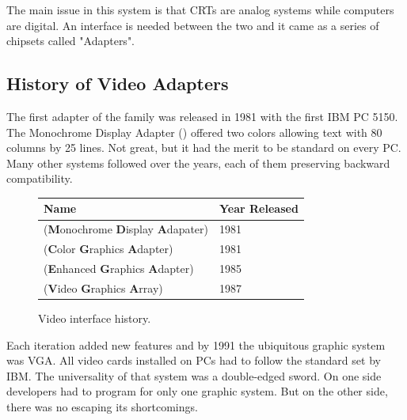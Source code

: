 \documentclass[book.tex]{subfiles}
\begin{document}
\par
The main issue in this system is that CRTs are analog systems while computers are digital. An interface is needed between the two and it came as a series of chipsets called "Adapters". 

  \subsection{History of Video Adapters}

The first adapter of the family was released in 1981 with the first IBM PC 5150. The Monochrome Display
   Adapter () offered two colors allowing text with 80 columns by 25 lines.  Not great, but it had the merit to be standard on every PC. Many other systems followed over the years, each of them preserving backward compatibility.
\bigskip
  
 \begin{figure}[H]
\centering  
\begin{tabularx}{\textwidth}{ X  Y }
  \toprule
  \textbf{Name} &  \textbf{Year Released} \\
  \toprule {}
   (\textbf{M}onochrome
   \textbf{D}isplay
   \textbf{A}dapater) & 1981 
   \\ 
   (\textbf{C}olor
   \textbf{G}raphics
   \textbf{A}dapter) & 1981 
    \\ 
   (\textbf{E}nhanced
   \textbf{G}raphics
   \textbf{A}dapter) & 1985
   \\ 
   (\textbf{V}ideo
   \textbf{G}raphics
   \textbf{A}rray)  & 1987
    \\
  \toprule
\end{tabularx}
\caption{Video interface history.}\label{fig:vga_history}
\end{figure}

Each iteration added new features and by 1991 the ubiquitous graphic system was VGA. All video cards installed on PCs had to follow the standard set by IBM. The universality of that system was a double-edged sword. On one side developers had to program for only one graphic system. But on the other side, there was no escaping its shortcomings.\\
\end{document}
